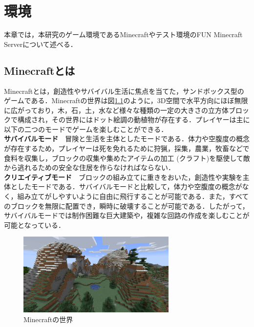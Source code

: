 \chapter{環境}	
\thispagestyle{plain}   %

本章では，本研究のゲーム環境であるMinecraftやテスト環境のFUN Minecraft Serverについて述べる．

\section{Minecraftとは}\label{sec:minecraft}
Minecraft\cite{bib:Minecraft}とは，創造性やサバイバル生活に焦点を当てた，サンドボックス型のゲームである．Minecraftの世界は図\ref{fig:mc_world}のように，3D空間で水平方向にほぼ無限に広がっており，木，石，土，水など様々な種類の一定の大きさの立方体ブロックで構成され，その世界にはドット絵調の動植物が存在する．プレイヤーは主に以下の二つのモードでゲームを楽しむことができる．\\

\textbf{サバイバルモード}　冒険と生活を主体としたモードである．体力や空腹度の概念が存在するため，プレイヤーは死を免れるために狩猟，採集，農業，牧畜などで食料を収集し，ブロックの収集や集めたアイテムの加工 (クラフト)を駆使して敵から逃れるための安全な住居を作らなければならない．\\

\textbf{クリエイティブモード}　ブロックの組み立てに重きをおいた，創造性や実験を主体としたモードである．サバイバルモードと比較して，体力や空腹度の概念がなく，組み立てがしやすいように自由に飛行することが可能である．また，すべてのブロックを無限に配置でき，瞬時に破壊することが可能である．したがって，サバイバルモードでは制作困難な巨大建築や，複雑な回路の作成を楽しむことが可能となっている．\\
\begin{figure}[H]
    \centering
    \includegraphics[width=0.7\textwidth]{fig/minecraft_world.png}
    \caption{Minecraftの世界}
    \label{fig:mc_world}
\end{figure}

